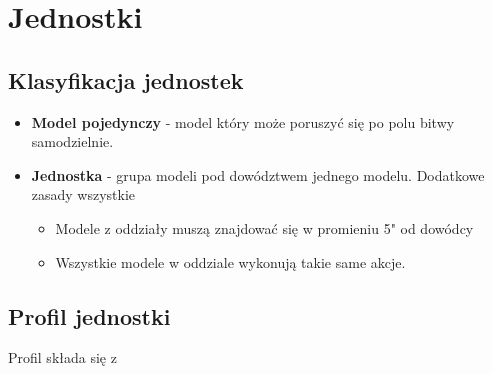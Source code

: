 \chapter{Jednostki}

\section{Klasyfikacja jednostek}
\begin{itemize}
    \item \textbf{Model pojedynczy} - model który może poruszyć się po polu bitwy samodzielnie.
    \item \textbf{Jednostka} - grupa modeli pod dowództwem jednego modelu.
    Dodatkowe zasady wszystkie
    \begin{itemize}
        \item Modele z oddziały muszą znajdować się w promieniu 5" od dowódcy
        \item Wszystkie modele w oddziale wykonują takie same akcje.
    \end{itemize}
\end{itemize}

\section{Profil jednostki}
Profil składa się z

